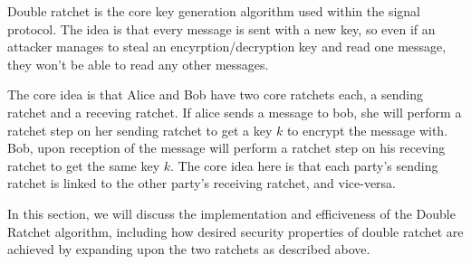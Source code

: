 Double ratchet is the core key generation algorithm used within the signal protocol.
The idea is that every message is sent with a new key, so even if an attacker manages 
to steal an encyrption/decryption key and read one message, they won't be able to read 
any other messages. 

The core idea is that Alice and Bob have two core ratchets each, a sending ratchet and a 
receving ratchet. If alice sends a message to bob, she will perform a ratchet step on her sending 
ratchet to get a key $k$ to encrypt the message with. Bob, upon reception of the message will perform 
a ratchet step on his receving ratchet to get the same key $k$. The core idea here is that each party's 
sending ratchet is linked to the other party's receiving ratchet, and vice-versa.

In this section, we will discuss the implementation and efficiveness of 
the Double Ratchet algorithm, including how desired security properties of double ratchet are 
achieved by expanding upon the two ratchets as described above.
